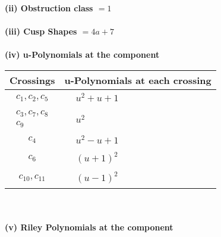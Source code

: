 \documentclass[1p]{elsarticle_modified}
\theoremstyle{definition}
\begin{document}
\flushleft \textbf{(ii) Obstruction class $= 1$}\\~\\
\flushleft \textbf{(iii) Cusp Shapes $= 4 a+7$}\\~\\
\newpage\renewcommand{\arraystretch}{1}
\flushleft \textbf{(iv) u-Polynomials at the component}\newline \\
\begin{tabular}{m{50pt}|m{274pt}}
Crossings & \hspace{64pt}u-Polynomials at each crossing \\
\hline $$\begin{aligned}c_{1},c_{2},c_{5}\end{aligned}$$&$\begin{aligned}
&u^2+u+1
\end{aligned}$\\
\hline $$\begin{aligned}c_{3},c_{7},c_{8}\\c_{9}\end{aligned}$$&$\begin{aligned}
&u^2
\end{aligned}$\\
\hline $$\begin{aligned}c_{4}\end{aligned}$$&$\begin{aligned}
&u^2- u+1
\end{aligned}$\\
\hline $$\begin{aligned}c_{6}\end{aligned}$$&$\begin{aligned}
&(u+1)^2
\end{aligned}$\\
\hline $$\begin{aligned}c_{10},c_{11}\end{aligned}$$&$\begin{aligned}
&(u-1)^2
\end{aligned}$\\
\hline
\end{tabular}\\~\\
\newpage\renewcommand{\arraystretch}{1}
\flushleft \textbf{(v) Riley Polynomials at the component}\newline \\
\end{document}
